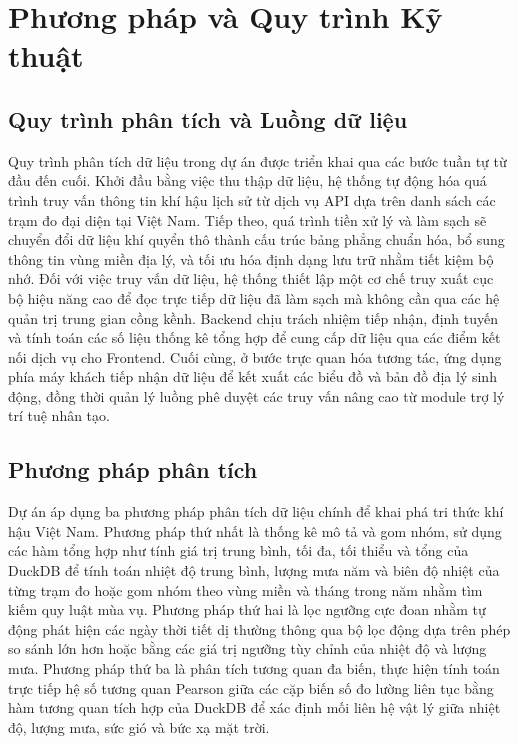 \chapter{Phương pháp và Quy trình Kỹ thuật}

\section{Quy trình phân tích và Luồng dữ liệu}
Quy trình phân tích dữ liệu trong dự án được triển khai qua các bước tuần tự từ đầu đến cuối. Khởi đầu bằng việc thu thập dữ liệu, hệ thống tự động hóa quá trình truy vấn thông tin khí hậu lịch sử từ dịch vụ API dựa trên danh sách các trạm đo đại diện tại Việt Nam. Tiếp theo, quá trình tiền xử lý và làm sạch sẽ chuyển đổi dữ liệu khí quyển thô thành cấu trúc bảng phẳng chuẩn hóa, bổ sung thông tin vùng miền địa lý, và tối ưu hóa định dạng lưu trữ nhằm tiết kiệm bộ nhớ. Đối với việc truy vấn dữ liệu, hệ thống thiết lập một cơ chế truy xuất cục bộ hiệu năng cao để đọc trực tiếp dữ liệu đã làm sạch mà không cần qua các hệ quản trị trung gian cồng kềnh. Backend chịu trách nhiệm tiếp nhận, định tuyến và tính toán các số liệu thống kê tổng hợp để cung cấp dữ liệu qua các điểm kết nối dịch vụ cho Frontend. Cuối cùng, ở bước trực quan hóa tương tác, ứng dụng phía máy khách tiếp nhận dữ liệu để kết xuất các biểu đồ và bản đồ địa lý sinh động, đồng thời quản lý luồng phê duyệt các truy vấn nâng cao từ module trợ lý trí tuệ nhân tạo.

\section{Phương pháp phân tích}
Dự án áp dụng ba phương pháp phân tích dữ liệu chính để khai phá tri thức khí hậu Việt Nam. Phương pháp thứ nhất là thống kê mô tả và gom nhóm, sử dụng các hàm tổng hợp như tính giá trị trung bình, tối đa, tối thiểu và tổng của DuckDB để tính toán nhiệt độ trung bình, lượng mưa năm và biên độ nhiệt của từng trạm đo hoặc gom nhóm theo vùng miền và tháng trong năm nhằm tìm kiếm quy luật mùa vụ. Phương pháp thứ hai là lọc ngưỡng cực đoan nhằm tự động phát hiện các ngày thời tiết dị thường thông qua bộ lọc động dựa trên phép so sánh lớn hơn hoặc bằng các giá trị ngưỡng tùy chỉnh của nhiệt độ và lượng mưa. Phương pháp thứ ba là phân tích tương quan đa biến, thực hiện tính toán trực tiếp hệ số tương quan Pearson giữa các cặp biến số đo lường liên tục bằng hàm tương quan tích hợp của DuckDB để xác định mối liên hệ vật lý giữa nhiệt độ, lượng mưa, sức gió và bức xạ mặt trời.

